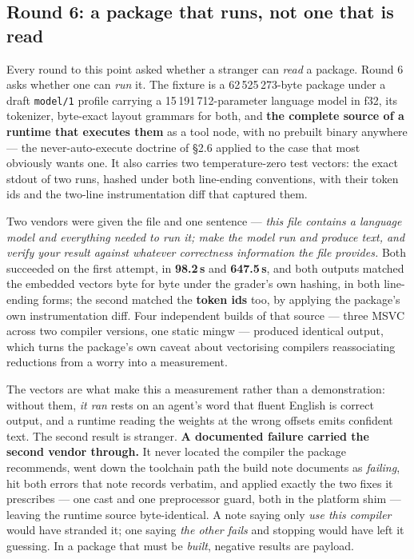 \documentclass[10pt,twocolumn,letterpaper]{article}
\newcommand{\code}[1]{\texttt{\small #1}}
\begin{document}
\subsection{Round 6: a package that runs, not one that is read}

Every round to this point asked whether a stranger can \emph{read} a package. Round 6 asks whether one can \emph{run} it. The fixture is a 62\,525\,273-byte package under a draft \code{model/1} profile carrying a 15\,191\,712-parameter language model in f32, its tokenizer, byte-exact layout grammars for both, and \textbf{the complete source of a runtime that executes them} as a tool node, with no prebuilt binary anywhere --- the never-auto-execute doctrine of \S2.6 applied to the case that most obviously wants one. It also carries two temperature-zero test vectors: the exact stdout of two runs, hashed under both line-ending conventions, with their token ids and the two-line instrumentation diff that captured them.

Two vendors were given the file and one sentence --- \emph{this file contains a language model and everything needed to run it; make the model run and produce text, and verify your result against whatever correctness information the file provides.} Both succeeded on the first attempt, in \textbf{98.2\,s} and \textbf{647.5\,s}, and both outputs matched the embedded vectors byte for byte under the grader's own hashing, in both line-ending forms; the second matched the \textbf{token ids} too, by applying the package's own instrumentation diff. Four independent builds of that source --- three MSVC across two compiler versions, one static mingw --- produced identical output, which turns the package's own caveat about vectorising compilers reassociating reductions from a worry into a measurement.

The vectors are what make this a measurement rather than a demonstration: without them, \emph{it ran} rests on an agent's word that fluent English is correct output, and a runtime reading the weights at the wrong offsets emits confident text. The second result is stranger. \textbf{A documented failure carried the second vendor through.} It never located the compiler the package recommends, went down the toolchain path the build note documents as \emph{failing}, hit both errors that note records verbatim, and applied exactly the two fixes it prescribes --- one cast and one preprocessor guard, both in the platform shim --- leaving the runtime source byte-identical. A note saying only \emph{use this compiler} would have stranded it; one saying \emph{the other fails} and stopping would have left it guessing. In a package that must be \emph{built}, negative results are payload.
\end{document}
